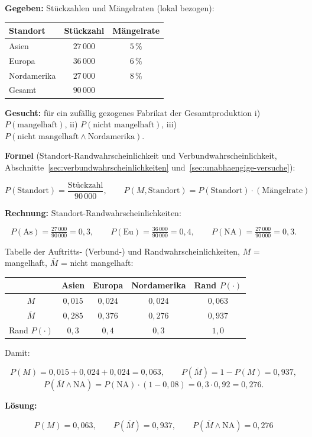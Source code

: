 \begin{beispiel}

\textbf{Gegeben:} Stückzahlen und Mängelraten (lokal bezogen):

\begin{center}
\renewcommand{\arraystretch}{1.2}
\begin{tabular}{l|c|c}
Standort & Stückzahl & Mängelrate \\
\hline
Asien       & $27\,000$ & $5\,\%$ \\
Europa      & $36\,000$ & $6\,\%$ \\
Nordamerika & $27\,000$ & $8\,\%$ \\
\hline
Gesamt      & $90\,000$ & \\
\end{tabular}
\end{center}

\textbf{Gesucht:} für ein zufällig gezogenes Fabrikat der Gesamtproduktion
i) $P(\text{mangelhaft})$, ii) $P(\text{nicht mangelhaft})$,
iii) $P(\text{nicht mangelhaft} \wedge \text{Nordamerika})$.

\textbf{Formel} (Standort-Randwahrscheinlichkeit und Verbundwahrscheinlichkeit,
Abschnitte~\ref{sec:verbundwahrscheinlichkeiten}
und~\ref{sec:unabhaengige-versuche}):

$$
P(\text{Standort}) = \frac{\text{Stückzahl}}{90\,000},\qquad
P(M,\text{Standort}) = P(\text{Standort})\cdot(\text{Mängelrate})
$$

\textbf{Rechnung:} Standort-Randwahrscheinlichkeiten:

$$
P(\text{As}) = \tfrac{27\,000}{90\,000} = 0{,}3,\qquad
P(\text{Eu}) = \tfrac{36\,000}{90\,000} = 0{,}4,\qquad
P(\text{NA}) = \tfrac{27\,000}{90\,000} = 0{,}3.
$$

Tabelle der Auftritts- (Verbund-) und Randwahrscheinlichkeiten, $M$ = mangelhaft,
$\overline{M}$ = nicht mangelhaft:

\begin{center}
\renewcommand{\arraystretch}{1.3}
\begin{tabular}{c|ccc|c}
 & Asien & Europa & Nordamerika & Rand $P(\cdot)$ \\
\hline
$M$            & $0{,}015$ & $0{,}024$ & $0{,}024$ & $0{,}063$ \\
$\overline{M}$ & $0{,}285$ & $0{,}376$ & $0{,}276$ & $0{,}937$ \\
\hline
Rand $P(\cdot)$ & $0{,}3$ & $0{,}4$ & $0{,}3$ & $1{,}0$ \\
\end{tabular}
\end{center}

Damit:

$$
P(M) = 0{,}015+0{,}024+0{,}024 = 0{,}063,\qquad
P(\overline{M}) = 1 - P(M) = 0{,}937,
$$
$$
P(\overline{M}\wedge\text{NA}) = P(\text{NA})\cdot(1-0{,}08) = 0{,}3\cdot 0{,}92 = 0{,}276.
$$

\textbf{Lösung:}

$$
\boxed{
P(M)=0{,}063,\qquad P(\overline{M})=0{,}937,\qquad
P(\overline{M}\wedge\text{NA})=0{,}276
}
$$

\end{beispiel}

